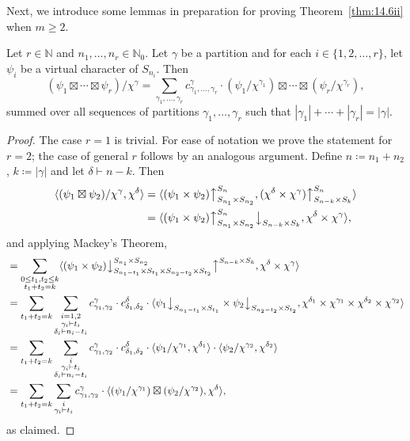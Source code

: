 \documentclass[ALCO, Unicode]{cedram}
\newcommand{\down}{\big\downarrow}
\newcommand{\up}{\big\uparrow}
\newcommand{\N}{\mathbb{N}}
\begin{document}
Next, we introduce some lemmas in preparation for proving Theorem~\ref{thm:14.6ii} when $m\ge 2$.

\begin{lemma}\label{lem:16.2}
	Let $r\in\N$ and $n_1,\dotsc,n_r\in\N_0$. Let $\gamma$ be a partition and for each $i\in\{1,2,\dotsc,r\}$, let $\psi_i$ be a virtual character of $S_{n_i}$. Then
	\[ (\psi_1\boxtimes\cdots\boxtimes\psi_r)/\chi^\gamma = \sum_{\gamma_1,\dotsc,\gamma_r} c^\gamma_{\gamma_1,\dotsc,\gamma_r}\cdot (\psi_1/\chi^{\gamma_1})\boxtimes\cdots\boxtimes(\psi_r/\chi^{\gamma_r}), \]
	summed over all sequences of partitions $\gamma_1,\dotsc,\gamma_r$ such that $|\gamma_1|+\cdots+|\gamma_r|=|\gamma|$.
\end{lemma}

\begin{proof}
	The case $r=1$ is trivial. For ease of notation we prove the statement for $r=2$; the case of general $r$ follows by an analogous argument. Define $n\coloneqq n_1+n_2$, $k\coloneqq |\gamma|$ and let $\delta\vdash n-k$. Then
	\begin{align*}
		\langle (\psi_1\boxtimes\psi_2)/\chi^\gamma,\chi^\delta\rangle &= \langle (\psi_1\times\psi_2)\up_{S_{n_1}\times S_{n_2}}^{S_n}, (\chi^\delta\times\chi^\gamma)\up_{S_{n-k}\times S_k}^{S_n}\rangle\\
		&= \langle (\psi_1\times\psi_2)\up_{S_{n_1}\times S_{n_2}}^{S_n}\down_{S_{n-k}\times S_k}, \chi^\delta\times\chi^\gamma\rangle,
	\end{align*}
	and applying Mackey's Theorem,
	\footnotesize
	\begin{align*}
		&= \sum_{\substack{0\le t_1,t_2\le k\\ t_1+t_2=k}} \langle (\psi_1\times\psi_2)\down^{S_{n_1}\times S_{n_2}}_{S_{n_1-t_1}\times S_{t_1}\times S_{n_2-t_2}\times S_{t_2}}\up^{S_{n-k}\times S_{k}}, \chi^\delta\times\chi^\gamma\rangle\\
		&= \sum_{t_1+t_2=k} \sum_{\substack{i=1,2\\\gamma_i\vdash t_i\\\delta_i\vdash n_i-t_i}} c^\gamma_{\gamma_1,\gamma_2}\cdot c^\delta_{\delta_1,\delta_2}\cdot \langle \psi_1\down_{S_{n_1-t_1}\times S_{t_1}} \times \psi_2\down_{S_{n_2-t_2}\times S_{t_2}}, \chi^{\delta_1}\times\chi^{\gamma_1}\times\chi^{\delta_2}\times\chi^{\gamma_2}\rangle\\
		&= \sum_{t_1+t_2=k} \sum_{\substack{i\\\gamma_i\vdash t_i\\\delta_i\vdash n_i-t_i}} c^\gamma_{\gamma_1,\gamma_2}\cdot c^\delta_{\delta_1,\delta_2}\cdot \langle \psi_1/\chi^{\gamma_1},\chi^{\delta_1}\rangle\cdot\langle \psi_2/\chi^{\gamma_2},\chi^{\delta_2}\rangle\\
		&= \sum_{t_1+t_2=k} \sum_{\substack{i\\\gamma_i\vdash t_i}} c^\gamma_{\gamma_1,\gamma_2}\cdot \langle (\psi_1/\chi^{\gamma_1})\boxtimes(\psi_2/\chi^{\gamma_2}), \chi^\delta\rangle,
	\end{align*}
	\normalsize
	as claimed.
\end{proof}
\end{document}
